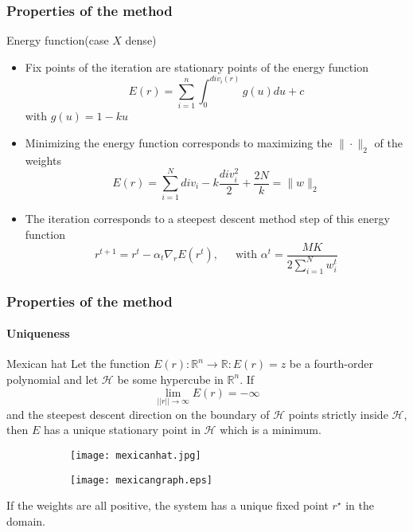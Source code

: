 \begin{frame}
\frametitle{Properties of the method}
\begin{block}{Energy function(case $X$ dense)}
\begin{itemize}
\item Fix points of the iteration are stationary points of the energy function
$$E(r) =  \sum_{i=1}^n \int_0^{div_i(r)}g(u) du + c $$with $g(u) = 1 -ku$
\item Minimizing the energy function corresponds to maximizing the $\| \cdot \|_2$ of the weights
$$E(r) = \sum_{i=1}^N div_i - k \frac{div_i^2}{2} + \frac{2N}{k} = \|w\|_2$$
\item The iteration corresponds to a steepest descent method step of this energy function
$$r^{t+1} = r^t - \alpha_t \nabla_r E(r^t)\text{, }\quad\text{ with }\alpha^t = \frac{MK}{2 \sum_{i=1}^N w^t_i}$$
\end{itemize}
\end{block}
\end{frame}
\begin{frame}
\frametitle{Properties of the method}
\framesubtitle{Uniqueness}
\begin{block}{Mexican hat}
Let the function $E(r) : \mathbb{R}^n \rightarrow \mathbb{R} : E(r) = z $ be a fourth-order polynomial and let $\mathcal{H}$ be some hypercube in $\mathbb{R}^n$. If 
$$\lim_{||r||\rightarrow \infty} E(r) = - \infty $$
and the steepest descent direction on the boundary of $\mathcal{H}$ points strictly inside $\mathcal{H}$, then $E$ has a unique stationary point in $\mathcal{H}$ which is a minimum.
\end{block}
\begin{figure}
\centering
\begin{subfigure}{0.5\textwidth}
\texttt{[image: mexicanhat.jpg]} 
\end{subfigure}
\begin{subfigure}{0.49\textwidth}
\texttt{[image: mexicangraph.eps]}
\end{subfigure}
\end{figure}
\begin{block}{}
If the weights are all positive, the system has a unique fixed point $r^{\star}$ in the domain.
\end{block}
\end{frame}

